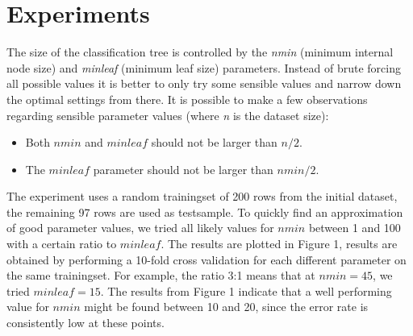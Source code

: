 \documentclass[a4paper,12pt]{scrartcl}
\begin{document}
\section{Experiments}
The size of the classification tree is controlled by the \textit{nmin} (minimum internal node size) and \textit{minleaf} (minimum leaf size) parameters. Instead of brute forcing all possible values it is better to only try some sensible values and narrow down the optimal settings from there. It is possible to make a few observations regarding sensible parameter values (where \textit{n} is the dataset size): 
    \begin{itemize}
        \item Both $nmin$ and $minleaf$ should not be larger than $n/2$.
        \item The $minleaf$ parameter should not be larger than $nmin/2$. 
    \end{itemize}
The experiment uses a random trainingset of 200 rows from the initial dataset, the remaining 97 rows are used as testsample.
To quickly find an approximation of good parameter values, we tried all likely values for $nmin$ between 1 and 100 with a certain ratio to $minleaf$. The results are plotted in Figure 1, results are obtained by performing a 10-fold cross validation for each different parameter on the same trainingset. For example, the ratio 3:1 means that at $nmin = 45$, we tried $minleaf = 15$. The results from Figure 1 indicate that a well performing value for $nmin$ might be found between 10 and 20, since the error rate is consistently low at these points. 
\\\\
\end{document}
